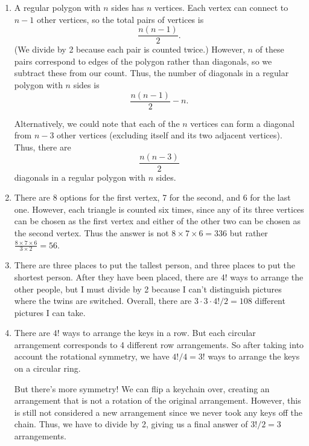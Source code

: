 \documentclass[12pt, letterpaper]{article}
\begin{document}
\begin{enumerate}
    \item A regular polygon with $n$ sides has $n$ vertices. Each vertex can connect to $n-1$ other vertices, so the total pairs of vertices is $$\frac{n(n-1)}{2}.$$ (We divide by 2 because each pair is counted twice.) However, $n$ of these pairs correspond to edges of the polygon rather than diagonals, so we subtract these from our count. Thus, the number of diagonals in a regular polygon with $n$ sides is $$\boxed{\frac{n(n-1)}{2} - n}.$$
    
    Alternatively, we could note that each of the $n$ vertices can form a diagonal from $n-3$ other vertices (excluding itself and its two adjacent vertices). Thus, there are $$\boxed{\frac{n(n-3)}{2}}$$ diagonals in a regular polygon with $n$ sides.
    \item There are 8 options for the first vertex, 7 for the second, and 6 for the last one. However, each triangle is counted six times, since any of its three vertices can be chosen as the first vertex and either of the other two can be chosen as the second vertex. Thus the answer is not $8\times7\times6=336$ but rather $\frac{8\times7\times6}{3\times2}=\boxed{56}$.
    \item There are three places to put the tallest person, and three places to put the shortest person. After they have been placed, there are 4! ways to arrange the other people, but I must divide by 2 because I can't distinguish pictures where the twins are switched. Overall, there are $3\cdot 3\cdot 4! / 2=\boxed{108}$ different pictures I can take.
    \item There are $4!$ ways to arrange the keys in a row. But each circular arrangement corresponds to 4 different row arrangements. So after taking into account the rotational symmetry, we have $4!/4=3!$ ways to arrange the keys on a circular ring.
    
    But there's more symmetry! We can flip a keychain over, creating an arrangement that is not a rotation of the original arrangement. However, this is still not considered a new arrangement since we never took any keys off the chain. Thus, we have to divide by 2, giving us a final answer of $3!/2=\boxed{3}$ arrangements.
\end{enumerate}
\end{document}
